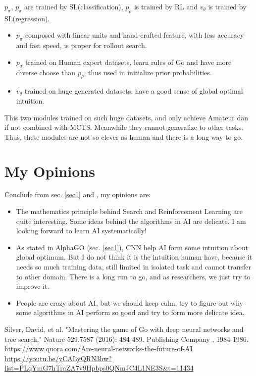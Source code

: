 \documentclass{mcmthesis}
\begin{document}
$p_\sigma$, $p_\pi$ are trained by SL(classification), $p_\rho$ is trained by RL and $v_\theta$ is trained by SL(regression). 
\begin{itemize}
	\item $p_\pi$ composed with linear units and hand-crafted feature, with less accuracy and fast speed, is proper for rollout search.
	\item $p_\sigma$ trained on Human expert datasets, learn rules of Go and have more diverse choose than $p_\rho$, thus used in initialize prior probabilities.
	\item $v_\theta$ trained on huge generated datasets, have a good sense of global optimal intuition.  
\end{itemize}
This two modules trained on such huge datasets, and only achieve Amateur dan if not combined with MCTS. Meanwhile they cannot generalize to other tasks. Thus, these modules are not so clever as human and there is a long way to go.


\section{My Opinions}
Conclude from sec. \ref{sec1} and \cite{2}, my opinions are: 
\begin{itemize}
	\item  The mathematics principle behind Search and Reinforcement Learning are quite interesting. Some ideas behind  the algorithms in AI are delicate.  I am looking forward to learn AI systematically!
	\item As stated in AlphaGO (sec. \ref{sec1}), CNN help AI form some intuition about global optimum. But I do not think it is the intuition  human have, because it needs so much training data, still limited in isolated task and cannot transfer to other domain. There is a long run to go, and as researchers, we just try to improve it. 
	\item People are crazy about AI, but we should keep calm, try to figure out why some algorithms in AI perform so good and try to form more delicate idea.
\end{itemize}		
\begin{thebibliography}{99}
 Silver, David, et al. "Mastering the game of Go with deep neural networks and tree search." Nature 529.7587 (2016): 484-489.
Publishing Company , 1984-1986.
 \url{https://www.quora.com/Are-neural-networks-the-future-of-AI}
 \url{https://youtu.be/yCALyQRN3hw?list=PLqYmG7hTraZA7v9Hpbps0QNmJC4L1NE3S&t=11434}

\end{thebibliography}	
	
\end{document}
